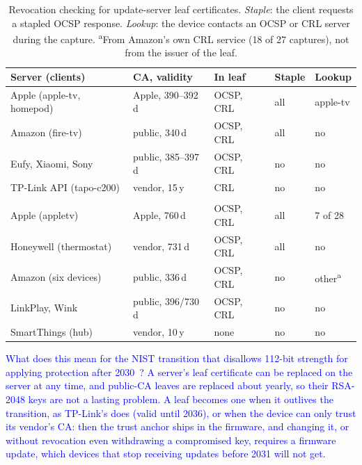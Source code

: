 \begin{table}[!t]
    \centering
    \color{blue}
    \caption{Revocation checking for update-server leaf certificates. \emph{Staple}: the client requests a stapled OCSP response. \emph{Lookup}: the device contacts an OCSP or CRL server during the capture. \textsuperscript{a}From Amazon's own CRL service (18 of 27 captures), not from the issuer of the leaf.}
    \label{tab:revocation}
    \setlength{\tabcolsep}{3pt}
    \footnotesize
    \begin{tabular}{@{} >{\raggedright\arraybackslash}p{2.45cm} l l l l @{}}
        \toprule
        \textbf{Server (clients)} & \textbf{CA, validity} & \textbf{In leaf} & \textbf{Staple} & \textbf{Lookup} \\
        \midrule
        Apple (apple-tv, homepod) & Apple, 390--392\,d & OCSP, CRL & all & apple-tv \\
        Amazon (fire-tv)          & public, 340\,d     & OCSP, CRL & all & no \\
        Eufy, Xiaomi, Sony        & public, 385--397\,d & OCSP, CRL & no & no \\
        TP-Link API (tapo-c200)   & vendor, 15\,y      & CRL       & no  & no \\
        \addlinespace
        \multicolumn{5}{@{}l}{\emph{2019 traces}} \\
        Apple (appletv)           & Apple, 760\,d      & OCSP, CRL & all & 7 of 28 \\
        Honeywell (thermostat)    & vendor, 731\,d     & OCSP, CRL & all & no \\
        Amazon (six devices)      & public, 336\,d     & OCSP, CRL & no  & other\textsuperscript{a} \\
        LinkPlay, Wink            & public, 396/730\,d & OCSP, CRL & no  & no \\
        SmartThings (hub)         & vendor, 10\,y      & none      & no  & no \\
        \bottomrule
    \end{tabular}
\end{table}

\textcolor{blue}{What does this mean for the NIST transition that disallows 112-bit strength for applying protection after 2030~\cite{NIST2020-SP800-57}?
A server's leaf certificate can be replaced on the server at any time, and public-CA leaves are replaced about yearly, so their RSA-2048 keys are not a lasting problem.
A leaf becomes one when it outlives the transition, as TP-Link's does (valid until 2036), or when the device can only trust its vendor's CA: then the trust anchor ships in the firmware, and changing it, or without revocation even withdrawing a compromised key, requires a firmware update, which devices that stop receiving updates before 2031 will not get.}

